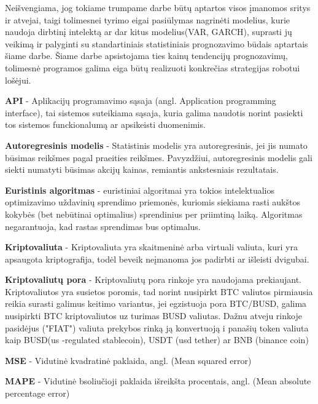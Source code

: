 \documentclass{VUMIFInfKursinis}
\begin{document}
Neišvengiama, jog tokiame trumpame darbe būtų aptartos visos įmanomos sritys ir atvejai, taigi tolimesnei tyrimo eigai pasiūlymas nagrinėti modelius, 
kurie naudoja dirbtinį intelektą ar dar kitus modelius(VAR, GARCH), suprasti jų veikimą ir palyginti su standartiniais statistiniais prognozavimo būdais aptartais šiame darbe.
Šiame darbe apsistojama ties kainų tendencijų prognozavimų, tolimesnė programos galima eiga būtų realizuoti konkrečias strategijas robotui lošėjui.

\textbf{API} - Aplikacijų programavimo sąsaja (angl. Application programming interface), tai sistemos suteikiama sąsaja, kuria galima naudotis norint pasiekti tos sistemos
funckionalumą ar apsikeisti duomenimis.

\textbf{Autoregresinis modelis} - Statistinis modelis yra autoregresinis, jei jis numato būsimas reikšmes pagal praeities reikšmes. Pavyzdžiui, autoregresinis modelis gali
siekti numatyti būsimas akcijų kainas, remiantis ankstesniais rezultatais.

\textbf{Euristinis algoritmas} - euristiniai algoritmai yra tokios intelektualios optimizavimo uždavinių sprendimo priemonės, kuriomis siekiama rasti aukštos
kokybės (bet nebūtinai optimalius) sprendinius per priimtiną laiką. Algoritmas negarantuoja, kad rastas sprendimas bus optimalus. \cite{misevivcius2009euristiniku}

\textbf{Kriptovaliuta} - Kriptovaliuta yra skaitmeninė arba virtuali valiuta, kuri yra apsaugota kriptografija, todėl beveik neįmanoma jos padirbti ar išleisti dvigubai.

\textbf{Kriptovaliutų pora} - Kriptovaliutų pora rinkoje yra naudojama prekiaujant. Kriptovaliutos yra susietos poromis, tad norint nusipirkt BTC valiutos pirmiausia reikia surasti 
galimus keitimo variantus, jei egzistuoja pora BTC/BUSD, galima nusipirkti BTC kriptovaliutos uz turimas BUSD valiutas. Dažnu atveju rinkoje pasidėjus ("FIAT") valiuta
prekybos rinką ją konvertuoją i panašių token valiuta kaip BUSD(us -regulated stablecoin), USDT (usd tether) ar BNB (binance coin)

\textbf{MSE} - Vidutinė kvadratinė paklaida, angl. (Mean squared error)

\textbf{MAPE} - Vidutinė  bsoliučioji paklaida išreikšta procentais, angl. (Mean absolute percentage error)

\printbibliography[heading=bibintoc] %

\appendix  %
\end{document}
